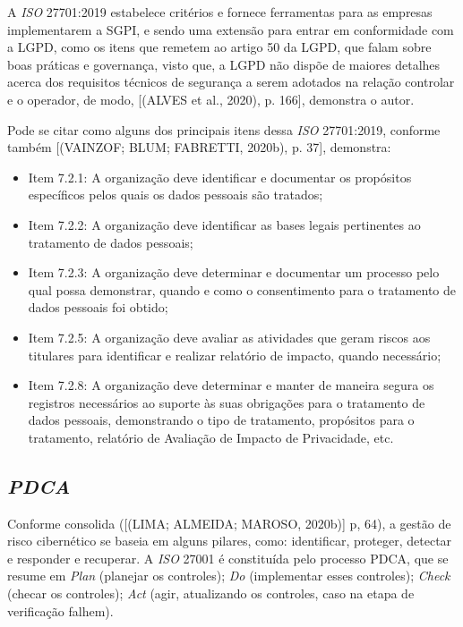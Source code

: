 \documentclass[
	12pt,				%
	openright,			%
	oneside,			%
	a4paper,			%
	english,			%
	french,				%
	spanish,			%
	brazil,				%
	]{abntex2}
\begin{document}
A \textit{ISO} 27701:2019 estabelece critérios e fornece ferramentas para as empresas implementarem a SGPI, e sendo uma extensão para entrar em conformidade com a LGPD, como os itens que remetem ao artigo 50 da LGPD, que falam sobre boas práticas e governança, visto que, a LGPD não dispõe de maiores detalhes acerca dos requisitos técnicos de segurança a serem adotados na relação controlar e o operador, de modo, [(ALVES et al., 2020), p. 166], demonstra o autor. 

 Pode se citar como alguns dos principais itens dessa \textit{ISO} 27701:2019, conforme também [(VAINZOF; BLUM; FABRETTI, 2020b), p. 37], demonstra:
\begin{itemize}
\item Item 7.2.1: A organização deve identificar e documentar os propósitos específicos pelos quais os dados pessoais são tratados;
\item Item 7.2.2: A organização deve identificar as bases legais pertinentes ao tratamento de dados pessoais;
\item Item 7.2.3: A organização deve determinar e documentar um processo pelo qual possa demonstrar, quando e como o consentimento para o  tratamento de dados pessoais foi obtido;
\item Item 7.2.5: A organização deve avaliar as atividades que geram riscos aos titulares para identificar e realizar relatório de impacto, quando necessário;
\item Item 7.2.8: A organização deve determinar e manter de maneira segura os registros necessários ao suporte às suas obrigações para o tratamento de dados pessoais, demonstrando o tipo de tratamento, propósitos para o tratamento, relatório de Avaliação de Impacto de Privacidade, etc.
\end{itemize}

\subsection{ \textit{PDCA} }

Conforme consolida ([(LIMA; ALMEIDA; MAROSO, 2020b)] p, 64), a gestão de risco cibernético se baseia em alguns pilares, como: identificar, proteger, detectar e responder e recuperar. A \textit{ISO} 27001 é constituída pelo processo PDCA, que se resume em \textit{Plan} (planejar os controles); \textit{Do} (implementar esses controles); \textit{Check} (checar os controles); \textit{Act} (agir, atualizando os controles, caso na etapa de verificação falhem).
\end{document}
